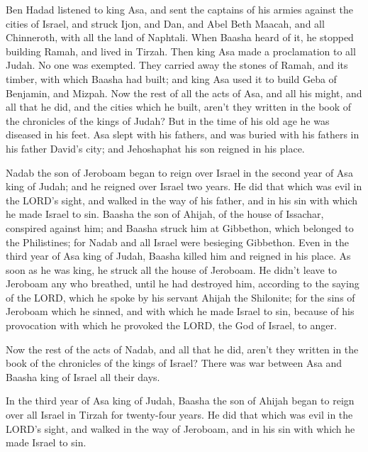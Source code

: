  Ben Hadad listened to king Asa, and sent the captains of
his armies against the cities of Israel, and struck Ijon, and Dan, and
Abel Beth Maacah, and all Chinneroth, with all the land of Naphtali.
 When Baasha heard of it, he stopped building Ramah, and
lived in Tirzah.  Then king Asa made a proclamation to all
Judah. No one was exempted. They carried away the stones of Ramah, and
its timber, with which Baasha had built; and king Asa used it to build
Geba of Benjamin, and Mizpah.  Now the rest of all the acts
of Asa, and all his might, and all that he did, and the cities which he
built, aren't they written in the book of the chronicles of the kings of
Judah? But in the time of his old age he was diseased in his feet.
 Asa slept with his fathers, and was buried with his
fathers in his father David's city; and Jehoshaphat his son reigned in
his place.

 Nadab the son of Jeroboam began to reign over Israel in
the second year of Asa king of Judah; and he reigned over Israel two
years.  He did that which was evil in the LORD's sight, and
walked in the way of his father, and in his sin with which he made
Israel to sin.  Baasha the son of Ahijah, of the house of
Issachar, conspired against him; and Baasha struck him at Gibbethon,
which belonged to the Philistines; for Nadab and all Israel were
besieging Gibbethon.  Even in the third year of Asa king of
Judah, Baasha killed him and reigned in his place.  As soon
as he was king, he struck all the house of Jeroboam. He didn't leave to
Jeroboam any who breathed, until he had destroyed him, according to the
saying of the LORD, which he spoke by his servant Ahijah the Shilonite;
 for the sins of Jeroboam which he sinned, and with which
he made Israel to sin, because of his provocation with which he provoked
the LORD, the God of Israel, to anger.

 Now the rest of the acts of Nadab, and all that he did,
aren't they written in the book of the chronicles of the kings of
Israel?  There was war between Asa and Baasha king of
Israel all their days.

 In the third year of Asa king of Judah, Baasha the son of
Ahijah began to reign over all Israel in Tirzah for twenty-four years.
 He did that which was evil in the LORD's sight, and walked
in the way of Jeroboam, and in his sin with which he made Israel to sin.

